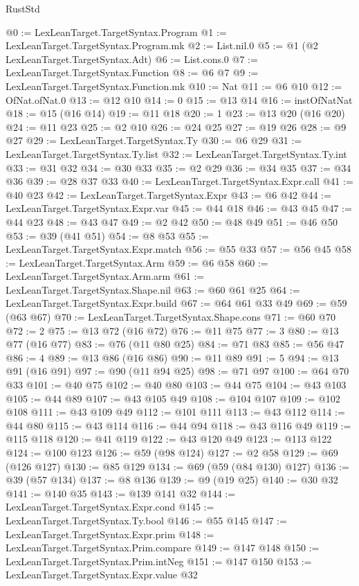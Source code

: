 \begin{lexlean}{RustStd}
\begin{coremodule}
@0 := LexLeanTarget.TargetSyntax.Program
@1 := LexLeanTarget.TargetSyntax.Program.mk
@2 := List.nil.{0}
@5 := @1 (@2 LexLeanTarget.TargetSyntax.Adt)
@6 := List.cons.{0}
@7 := LexLeanTarget.TargetSyntax.Function
@8 := @6 @7
@9 := LexLeanTarget.TargetSyntax.Function.mk
@10 := Nat
@11 := @6 @10
@12 := OfNat.ofNat.{0}
@13 := @12 @10
@14 := 0
@15 := @13 @14
@16 := instOfNatNat
@18 := @15 (@16 @14)
@19 := @11 @18
@20 := 1
@23 := @13 @20 (@16 @20)
@24 := @11 @23
@25 := @2 @10
@26 := @24 @25
@27 := @19 @26
@28 := @9 @27
@29 := LexLeanTarget.TargetSyntax.Ty
@30 := @6 @29
@31 := LexLeanTarget.TargetSyntax.Ty.list
@32 := LexLeanTarget.TargetSyntax.Ty.int
@33 := @31 @32
@34 := @30 @33
@35 := @2 @29
@36 := @34 @35
@37 := @34 @36
@39 := @28 @37 @33
@40 := LexLeanTarget.TargetSyntax.Expr.call
@41 := @40 @23
@42 := LexLeanTarget.TargetSyntax.Expr
@43 := @6 @42
@44 := LexLeanTarget.TargetSyntax.Expr.var
@45 := @44 @18
@46 := @43 @45
@47 := @44 @23
@48 := @43 @47
@49 := @2 @42
@50 := @48 @49
@51 := @46 @50
@53 := @39 (@41 @51)
@54 := @8 @53
@55 := LexLeanTarget.TargetSyntax.Expr.match
@56 := @55 @33
@57 := @56 @45
@58 := LexLeanTarget.TargetSyntax.Arm
@59 := @6 @58
@60 := LexLeanTarget.TargetSyntax.Arm.arm
@61 := LexLeanTarget.TargetSyntax.Shape.nil
@63 := @60 @61 @25
@64 := LexLeanTarget.TargetSyntax.Expr.build
@67 := @64 @61 @33 @49
@69 := @59 (@63 @67)
@70 := LexLeanTarget.TargetSyntax.Shape.cons
@71 := @60 @70
@72 := 2
@75 := @13 @72 (@16 @72)
@76 := @11 @75
@77 := 3
@80 := @13 @77 (@16 @77)
@83 := @76 (@11 @80 @25)
@84 := @71 @83
@85 := @56 @47
@86 := 4
@89 := @13 @86 (@16 @86)
@90 := @11 @89
@91 := 5
@94 := @13 @91 (@16 @91)
@97 := @90 (@11 @94 @25)
@98 := @71 @97
@100 := @64 @70 @33
@101 := @40 @75
@102 := @40 @80
@103 := @44 @75
@104 := @43 @103
@105 := @44 @89
@107 := @43 @105 @49
@108 := @104 @107
@109 := @102 @108
@111 := @43 @109 @49
@112 := @101 @111
@113 := @43 @112
@114 := @44 @80
@115 := @43 @114
@116 := @44 @94
@118 := @43 @116 @49
@119 := @115 @118
@120 := @41 @119
@122 := @43 @120 @49
@123 := @113 @122
@124 := @100 @123
@126 := @59 (@98 @124)
@127 := @2 @58
@129 := @69 (@126 @127)
@130 := @85 @129
@134 := @69 (@59 (@84 @130) @127)
@136 := @39 (@57 @134)
@137 := @8 @136
@139 := @9 (@19 @25)
@140 := @30 @32
@141 := @140 @35
@143 := @139 @141 @32
@144 := LexLeanTarget.TargetSyntax.Expr.cond
@145 := LexLeanTarget.TargetSyntax.Ty.bool
@146 := @55 @145
@147 := LexLeanTarget.TargetSyntax.Expr.prim
@148 := LexLeanTarget.TargetSyntax.Prim.compare
@149 := @147 @148
@150 := LexLeanTarget.TargetSyntax.Prim.intNeg
@151 := @147 @150
@153 := LexLeanTarget.TargetSyntax.Expr.value @32

\end{coremodule}
\end{lexlean}
